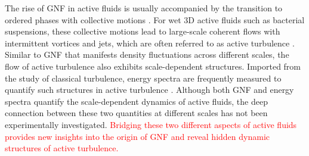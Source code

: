 \documentclass[twocolumn,aps,prl,amsmath,amssymb,longbibliography]{revtex4-2}
\begin{document}
The rise of GNF in active fluids is usually accompanied by the transition to ordered phases with collective motions \cite{Ramaswamy2010,Marchetti2013}. For wet 3D active fluids such as bacterial suspensions, these collective motions lead to large-scale coherent flows with intermittent vortices and jets, which are often referred to as active turbulence \cite{Wolgemuth2008,Wensink2012,Dunkel2013a,Bratanov2015,Guo2018,Linkmann2019,Bardfalvy2019,Alert2020,Skultety2020,Peng2020}. Similar to GNF that manifests density fluctuations across different scales, the flow of active turbulence also exhibits scale-dependent structures. Imported from the study of classical turbulence, energy spectra are frequently measured to quantify such structures in active turbulence \cite{Ishikawa2011,Wensink2012,Dunkel2013a,Giomi2015,Creppy2015,Patteson2018,Alert2020}. Although both GNF and energy spectra quantify the scale-dependent dynamics of active fluids, the deep connection between these two quantities at different scales has not been experimentally investigated. \textcolor{red}{Bridging these two different aspects of active fluids provides new insights into the origin of GNF and reveal hidden dynamic structures of active turbulence.}

\end{document}
